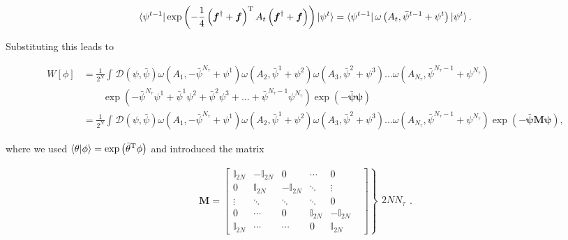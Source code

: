 \documentclass{article}
\begin{document}
	\begin{align}
		\bra{\psi^{t-1}}\exp{\left(-\frac{1}{4}\left(\boldsymbol{f}^\dagger + \boldsymbol{f}\right)^\mathrm{T}  A_{t} \left(\boldsymbol{f}^\dagger + \boldsymbol{f}\right)\right)}\ket{\psi^{t}} = \bra{\psi^{t-1}}\omega\left(A_t, \bar{\psi}^{t-1} + \psi^t\right)\ket{\psi^t}.
	\end{align}
	
	Substituting this leads to
	
	\begin{align}
		W\left[ \phi \right] &= \frac{1}{2^N} \int_{ }^{} \mathcal{D}\left({\psi},\bar{\psi}\right) \omega \left(A_1, -\bar{\psi}^{N_\tau} + \psi^1\right)\omega \left(A_2, \bar{\psi}^1 + \psi^2\right)\omega \left(A_3, \bar{\psi}^2 + \psi ^3\right)...\omega \left(A_{N_\tau}, \bar{\psi}^{N_\tau - 1} + \psi^{N_\tau} \right) \nonumber\\ 
		&\quad \quad\exp \left( -\bar{\psi}^{N_\tau} \psi^1 + \bar{\psi}^1 \psi^2 + \bar{\psi}^2 \psi^3 + ... + \bar{\psi}^{N_\tau - 1}\psi^{N_\tau}     \right)  \exp \left( \boldsymbol{-\bar{\psi}\boldsymbol{\psi} } \right)\nonumber \\ 
		&= \frac{1}{2^N} \int_{ }^{ } \mathcal{D}\left({\psi},\bar{\psi}\right) \omega \left(A_1, -\bar{\psi}^{N_\tau} + \psi^1\right)\omega \left(A_2, \bar{\psi}^1 + \psi^2\right)\omega \left(A_3, \bar{\psi}^2 + \psi ^3\right)...\omega \left(A_{N_\tau}, \bar{\psi}^{N_\tau - 1} + \psi^{N_\tau} \right)  \exp \left( \boldsymbol{-\bar{\psi}\boldsymbol{M}\boldsymbol{\psi} } \right),
	\end{align}
	
	where we used $\braket{\theta|\phi} = \exp \left( \bar{\theta}^\mathrm{T}   \phi \right)  $ and introduced the matrix
	
	\begin{align}
		\boldsymbol{M} =
		\left.
		\begin{bmatrix}
			\mathbb{I}_{2N} & -\mathbb{I}_{2N} & 0 & \cdots & 0 \\
			0 & \mathbb{I}_{2N} & -\mathbb{I}_{2N} & \ddots & \vdots \\
			\vdots & \ddots & \ddots & \ddots & 0\\
			0 & \cdots & 0 & \mathbb{I}_{2N} & -\mathbb{I}_{2N}\\
			\mathbb{I}_{2N} & \cdots & \cdots & 0 & \mathbb{I}_{2N} &
		\end{bmatrix}
		\right\}
		\begin{array}{c}
			2N N_\tau
		\end{array}.
	\end{align}
	
\end{document}
